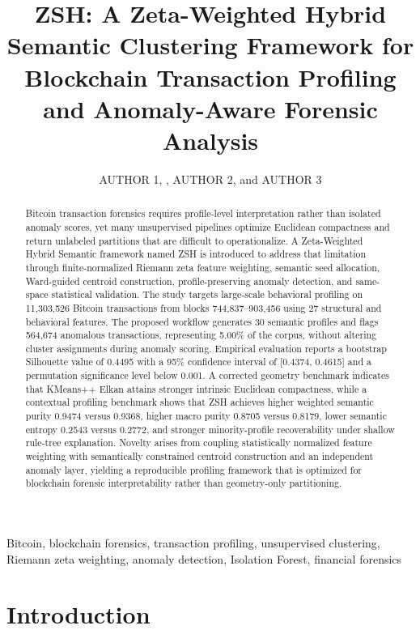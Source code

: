 \documentclass{ieeeaccess}
\title{ZSH: A Zeta-Weighted Hybrid Semantic Clustering Framework for Blockchain Transaction Profiling and Anomaly-Aware Forensic Analysis}
\author{\uppercase{Author 1}, \IEEEmembership{Student Member, IEEE},
\uppercase{Author 2}, and \uppercase{Author 3}}
\begin{document}
\titlepgskip=-15pt
\maketitle

\begin{abstract}
Bitcoin transaction forensics requires profile-level interpretation rather than isolated anomaly scores, yet many unsupervised pipelines optimize Euclidean compactness and return unlabeled partitions that are difficult to operationalize. A Zeta-Weighted Hybrid Semantic framework named ZSH is introduced to address that limitation through finite-normalized Riemann zeta feature weighting, semantic seed allocation, Ward-guided centroid construction, profile-preserving anomaly detection, and same-space statistical validation. The study targets large-scale behavioral profiling on 11,303,526 Bitcoin transactions from blocks 744,837--903,456 using 27 structural and behavioral features. The proposed workflow generates 30 semantic profiles and flags 564,674 anomalous transactions, representing 5.00\% of the corpus, without altering cluster assignments during anomaly scoring. Empirical evaluation reports a bootstrap Silhouette value of 0.4495 with a 95\% confidence interval of [0.4374, 0.4615] and a permutation significance level below 0.001. A corrected geometry benchmark indicates that KMeans++ Elkan attains stronger intrinsic Euclidean compactness, while a contextual profiling benchmark shows that ZSH achieves higher weighted semantic purity 0.9474 versus 0.9368, higher macro purity 0.8705 versus 0.8179, lower semantic entropy 0.2543 versus 0.2772, and stronger minority-profile recoverability under shallow rule-tree explanation. Novelty arises from coupling statistically normalized feature weighting with semantically constrained centroid construction and an independent anomaly layer, yielding a reproducible profiling framework that is optimized for blockchain forensic interpretability rather than geometry-only partitioning.
\end{abstract}

\begin{IEEEkeywords}
Bitcoin, blockchain forensics, transaction profiling, unsupervised clustering, Riemann zeta weighting, anomaly detection, Isolation Forest, financial forensics
\end{IEEEkeywords}

\section{Introduction}
\end{document}
